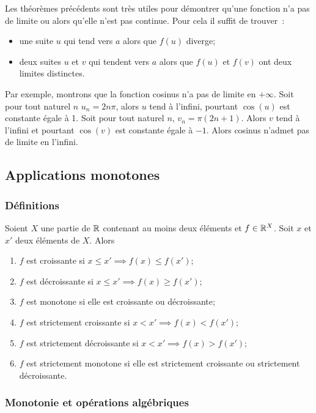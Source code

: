 Les théorèmes précédents sont très utiles pour démontrer qu'une fonction n'a pas de limite ou alors qu'elle n'est pas continue. Pour cela il suffit de trouver~:
\begin{itemize}
\item une suite $u$ qui tend vers $a$ alors que $f(u)$ diverge;
\item deux suites $u$ et $v$ qui tendent vers $a$ alors que $f(u)$ et $f(v)$ ont deux limites distinctes.
\end{itemize}

Par exemple, montrons que la fonction cosinus n'a pas de limite en $+\infty$. Soit pour tout naturel $n$ $u_n=2n\pi$, alors $u$ tend à l'infini, pourtant $\cos(u)$ est constante égale à 1. Soit pour tout naturel $n$, $v_n=\pi(2n+1)$. Alors $v$ tend à l'infini et pourtant $\cos(v)$ est constante égale à $-1$. Alors cosinus n'admet pas de limite en l'infini.

\subsection{Applications monotones}

\subsubsection{Définitions}

Soient $X$ une partie de $\mathbb{R}$ contenant au moins deux éléments et $f \in \mathbb{R}^X$. Soit $x$ et $x'$ deux éléments de $X$. Alors
\begin{enumerate}
\item $f$ est croissante si $x \leqslant x' \implies f(x) \leqslant f(x')$;
\item $f$ est décroissante si $x \leqslant x' \implies f(x) \geqslant f(x')$;
\item $f$ est monotone si elle est croissante ou décroissante;
\item $f$ est strictement croissante si $x < x' \implies f(x) < f(x')$;
\item $f$ est strictement décroissante si $x < x' \implies f(x) > f(x')$;
\item $f$ est strictement monotone si elle est strictement croissante ou strictement décroissante.
\end{enumerate}

\subsubsection{Monotonie et opérations algébriques}

